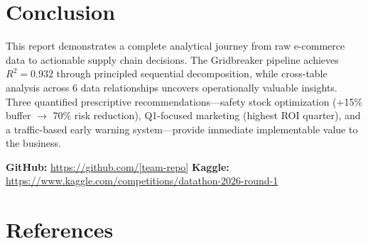 \documentclass{article}
\begin{document}
\section{Conclusion}

This report demonstrates a complete analytical journey from raw e-commerce data to actionable supply chain decisions. The Gridbreaker pipeline achieves $R^2 = 0.932$ through principled sequential decomposition, while cross-table analysis across 6 data relationships uncovers operationally valuable insights. Three quantified prescriptive recommendations---safety stock optimization (+15\% buffer $\rightarrow$ 70\% risk reduction), Q1-focused marketing (highest ROI quarter), and a traffic-based early warning system---provide immediate implementable value to the business.

\textbf{GitHub:} \url{https://github.com/[team-repo]} \quad \textbf{Kaggle:} \url{https://www.kaggle.com/competitions/datathon-2026-round-1}

\section*{References}
\end{document}
